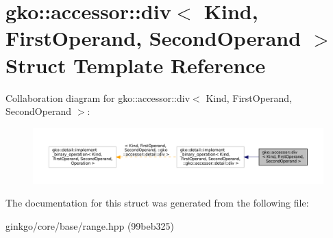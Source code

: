 \hypertarget{structgko_1_1accessor_1_1div}{}\section{gko\+:\+:accessor\+:\+:div$<$ Kind, First\+Operand, Second\+Operand $>$ Struct Template Reference}
\label{structgko_1_1accessor_1_1div}


Collaboration diagram for gko\+:\+:accessor\+:\+:div$<$ Kind, First\+Operand, Second\+Operand $>$\+:
\nopagebreak
\begin{figure}[H]
\begin{center}
\leavevmode
\includegraphics[width=350pt]{structgko_1_1accessor_1_1div__coll__graph}
\end{center}
\end{figure}


The documentation for this struct was generated from the following file\+:\begin{DoxyCompactItemize}
\item 
ginkgo/core/base/range.\+hpp (99beb325)\end{DoxyCompactItemize}
